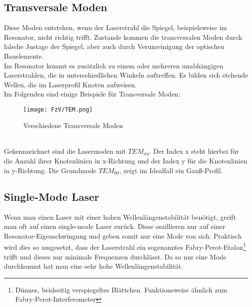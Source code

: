 \subsection{Transversale Moden}
Diese Moden entstehen, wenn der Laserstrahl die Spiegel, beispielsweise im Resonator, nicht richtig trifft.
Zustande kommen die transversalen Moden durch falsche Justage der Spiegel, aber auch durch Verunreinigung der 
optischen Bauelemente. \\
Im Resonator kommt es zusätzlich zu einem oder mehreren unabhängigen Laserstrahlen, die in unterschiedlichen Winkeln auftreffen.
Es bilden sich stehende Wellen, die im Laserprofil Knoten aufweisen.\\
\newpage
Im Folgenden sind einige Beispiele für Transversale Moden:
\begin{figure}[h]
    \centering
    \texttt{[image: FzV/TEM.png]}
    \label{fig:Tmode}
    \caption{Verschiedene Transversale Moden}
\end{figure}\\
Gekennzeichnet sind die Lasermoden mit $TEM_{xy}$. Der Index x steht hierbei für die Anzahl ihrer Knotenlinien in x-Richtung
und der Index y für die Knotenlinien in y-Richtung. Die Grundmode $TEM_{00}$, zeigt im Idealfall ein Gauß-Profil. \citep[vgl.][]{laser}


\subsection{Single-Mode Laser}
Wenn man einen Laser mit einer hohen Wellenlängenstabilität benötigt, greift man oft auf einen single-mode Laser zurück.
Diese oszillieren nur auf einer Resonator-Eigenschwingung und geben somit nur eine Mode von sich.
Praktisch wird dies so umgesetzt, dass der Laserstrahl ein sogenanntes Fabry-Perot-Etalon\footnote{Dünnes, beidseitig verspiegeltes Blättchen. Funktionsweise ähnlich zum Fabry-Perot-Interferometer} trifft und dieses nur minimale Frequenzen durchlässt.
Da so nur eine Mode durchkommt hat man eine sehr hohe Wellenlängenstabilität. \citep[vgl.][]{Laser-Dem}
